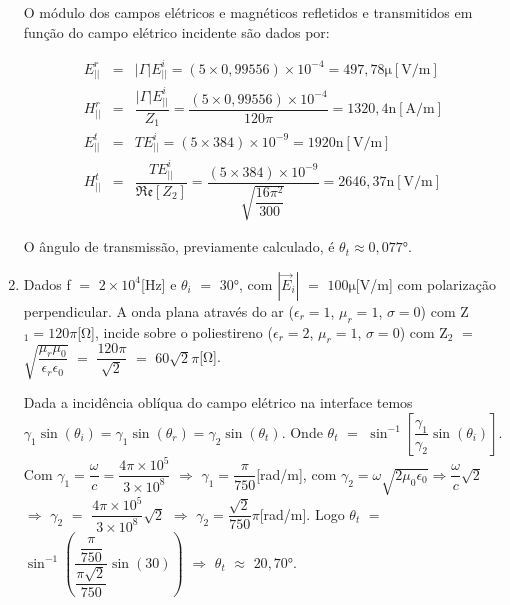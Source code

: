 \begin{enumerate}[1.]
O módulo dos campos elétricos e magnéticos refletidos e transmitidos em função do campo elétrico incidente são dados por:

\begin{eqnarray*}
E^{r}_{||} & = & |\Gamma| E^{i}_{||} = (5 \times 0,99556) \times 10^{-4} = 497,78\si{\micro}[\si{\volt/\meter}] \nonumber \\
H^{r}_{||} & = & \dfrac{|\Gamma| E^{i}_{||}}{Z_{1}} = \dfrac{(5 \times 0,99556) \times 10^{-4}}{120\pi} = 1320,4\si{\nano}[\si{\ampere/\meter}]\nonumber \\
E^{t}_{||} & = & T E^{i}_{||} = (5 \times 384) \times 10^{-9} = 1920\si{\nano}[\si{\volt/\meter}]\nonumber \\
H^{t}_{||} & = & \dfrac{T E^{i}_{||}}{\mathfrak{Re}[Z_{2}]} = \dfrac{(5 \times 384) \times 10^{-9}}{\sqrt{\dfrac{16\pi^{2}}{300}}} = 2646,37\si{\nano}[\si{\volt/\meter}]\nonumber
\end{eqnarray*}

O ângulo de transmissão, previamente calculado, é $\theta_{t} \approx 0,077$\si{\degree}.

\newpage

\item Dados f $=$ $2 \times 10^{4}$[\si{\hertz}] e $\theta_{i}$ $=$ $30$\si{\degree}, com $|\vec{E}_{i}|$ $=$ $100\si{\micro}$[\si{\volt/\meter}] com polarização perpendicular. A onda plana através do ar ($\epsilon_{r} = 1$, $\mu_{r} = 1$, $\sigma = 0$) com Z$_{1} = 120\pi$[\si{\ohm}], incide sobre o poliestireno ($\epsilon_{r} = 2$, $\mu_{r} = 1$, $\sigma = 0$) com Z$_{2}$ $=$ $\sqrt{\dfrac{\mu_{r}\mu_{0}}{\epsilon_{r}\epsilon_{0}}}$ $=$ $\dfrac{120\pi}{\sqrt{2}}$ $=$ $60\sqrt{2}\pi$[\si{\ohm}]. %

Dada a incidência oblíqua do campo elétrico na interface temos $\gamma_{1}\sin(\theta_i) = \gamma_{1}\sin(\theta_{r}) = \gamma_{2}\sin(\theta_{t})$. Onde $\theta_{t}$ $=$ $\sin^{-1}\left[\dfrac{\gamma_{1}}{\gamma_{2}}\sin(\theta_{i})\right]$. Com $\gamma_{1} = \dfrac{\omega}{c} = \dfrac{4\pi \times 10^{5}}{3 \times 10^{8}}$ $\Rightarrow$ $\gamma_{1} = \dfrac{\pi}{750}$[\si{\radian/\meter}], com $\gamma_{2} = \omega\sqrt{2\mu_{0}\epsilon_{0}} \Rightarrow \dfrac{\omega}{c}\sqrt{2}$ $\Rightarrow$ $\gamma_{2}$ $=$ $\dfrac{4\pi \times 10^{5}}{3\times 10^{8}}\sqrt{2}$ $\Rightarrow$ $\gamma_{2} = \dfrac{\sqrt{2}}{750}\pi$[\si{\radian/\meter}]. Logo $\theta_{t}$ $=$ $\sin^{-1}\left(\dfrac{\dfrac{\pi}{750}}{\dfrac{\pi\sqrt{2}}{750}}\sin(30)\right)$ $\Rightarrow$ $\theta_{t}$ $\approx$ $20,70$\si{\degree}.


\end{enumerate}
